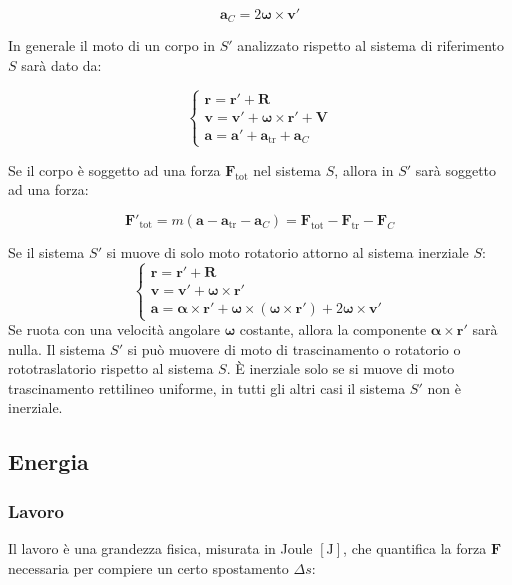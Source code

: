 \documentclass{article}
\newcommand{\vect}[1]{\boldsymbol{\mathbf{#1}}}
\numberwithin{equation}{subsection}
\begin{document}
\begin{equation}
    \vect{a}_C=2\vect{\omega}\times\vect{v}'
\end{equation}

In generale il moto di un corpo in $S'$ analizzato rispetto al sistema 
di riferimento $S$ sarà dato da:

\begin{equation}
    \begin{cases}
        \vect{r}=\vect{r}'+\vect{R}\\
        \vect{v}=\vect{v}'+\vect{\omega}\times\vect{r}'+\vect{V}\\
        \vect{a}=\vect{a}'+\vect{a}_\mathrm{tr}+\vect{a}_C
    \end{cases}
\end{equation}
    
Se il corpo è soggetto ad una forza $\vect{F}_\mathrm{tot}$ nel 
sistema $S$, allora in $S'$ sarà soggetto ad una forza: 

\begin{equation}
    \vect{F}'_\mathrm{tot}=m(\vect{a}-\vect{a}_\mathrm{tr}-\vect{a}_C)=\vect{F}_\mathrm{tot}-\vect{F}_\mathrm{tr}-\vect{F}_C
\end{equation}



Se il sistema $S'$ si muove di solo moto rotatorio attorno al sistema inerziale $S$:
\begin{equation}
    \begin{cases}
        \vect{r}=\vect{r}'+\vect{R}\\
        \vect{v}=\vect{v}'+\vect{\omega}\times\vect{r}'\\
        \vect{a}=\vect{\alpha}\times\vect{r}'+\vect{\omega}\times(\vect{\omega}\times\vect{r}')+2\vect{\omega}\times\vect{v}'
    \end{cases}
\end{equation}
Se ruota con una velocità angolare $\vect{\omega}$ costante, allora la componente $\vect{\alpha}\times\vect{r}'$ sarà nulla. 
Il sistema $S'$ si può muovere di moto di trascinamento o rotatorio  o rototraslatorio rispetto al sistema $S$. \`{E} inerziale solo se si muove di moto trascinamento rettilineo uniforme, in 
tutti gli altri casi il sistema $S'$ non è inerziale. 

\subsection{Energia}

\subsubsection{Lavoro}
Il lavoro è una grandezza fisica, misurata in Joule $\left[\mathrm{J}\right]$, che quantifica la forza $\vect{F}$
necessaria per compiere un certo spostamento $\Delta s$: 
\end{document}
